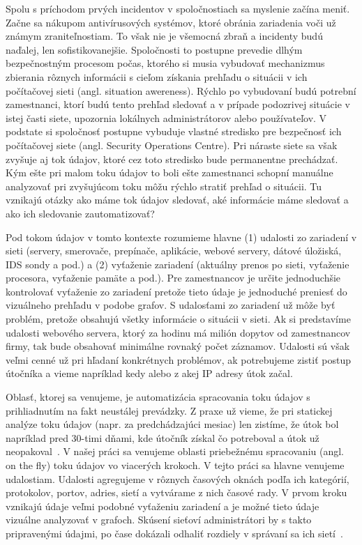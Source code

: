 \documentclass[thesismargins, thesislinespacing, openright, upjsfrontpage, combineabstracts]{rnthesis}
\begin{document}
Spolu s príchodom prvých incidentov v spoločnostiach sa myslenie začína meniť. Začne sa nákupom antivírusových systémov, ktoré obránia zariadenia voči už známym zraniteľnostiam. To však nie je všemocná zbraň a incidenty budú naďalej, len sofistikovanejšie. Spoločnosti to postupne prevedie dlhým bezpečnostným procesom počas, ktorého si musia vybudovať mechanizmus zbierania rôznych informácii s cieľom získania prehľadu o situácii v ich počítačovej sieti (angl. situation awereness). Rýchlo po vybudovaní budú potrební zamestnanci, ktorí budú tento prehľad sledovať a v prípade podozrivej situácie v istej časti siete, upozornia lokálnych administrátorov alebo používateľov. V podstate si spoločnosť postupne vybuduje vlastné stredisko pre bezpečnosť ich počítačovej siete (angl. Security Operations Centre). Pri náraste siete sa však zvyšuje aj tok údajov, ktoré cez toto stredisko bude permanentne prechádzať. Kým ešte pri malom toku údajov to boli ešte zamestnanci schopní manuálne analyzovať pri zvyšujúcom toku môžu rýchlo stratiť prehľad o situácii. Tu vznikajú otázky ako máme tok údajov sledovať, aké informácie máme sledovať a ako ich sledovanie zautomatizovať?

Pod tokom údajov v tomto kontexte rozumieme hlavne (1) udalosti zo zariadení v sieti (servery, smerovače, prepínače, aplikácie, webové servery, dátové úložiská, IDS sondy a pod.) a (2) vyťaženie zariadení (aktuálny prenos po sieti, vyťaženie procesora, vyťaženie pamäte a pod.). Pre zamestnancov je určite jednoduchšie kontrolovať vyťaženie zo zariadení pretože tieto údaje je jednoduché preniesť do vizuálneho prehľadu v podobe grafov. S udalosťami zo zariadení už môže byť problém, pretože obsahujú všetky informácie o situácii v sieti. Ak si predstavíme udalosti webového servera, ktorý za hodinu má milión dopytov od zamestnancov firmy, tak bude obsahovať minimálne rovnaký počet záznamov. Udalosti sú však veľmi cenné už pri hľadaní konkrétnych problémov, ak potrebujeme zistiť postup útočníka a vieme napríklad kedy alebo z akej IP adresy útok začal. 

Oblasť, ktorej sa venujeme, je automatizácia spracovania toku údajov s prihliadnutím na fakt neustálej prevádzky. Z praxe už vieme, že pri statickej analýze toku údajov (napr. za predchádzajúci mesiac) len zistíme, že útok bol napríklad pred 30-timi dňami, kde útočník získal čo potreboval a útok už neopakoval~\cite{park2010study}. V našej práci sa venujeme oblasti priebežnému spracovaniu (angl. on the fly) toku údajov vo viacerých krokoch. V tejto práci sa hlavne venujeme udalostiam. Udalosti agregujeme v rôznych časových oknách podľa ich kategórií, protokolov, portov, adries, sietí a vytvárame z nich časové rady. V prvom kroku vznikajú údaje veľmi podobné vyťaženiu zariadení a je možné tieto údaje vizuálne analyzovať v grafoch. Skúsení sieťoví administrátori by s takto pripravenými údajmi, po čase dokázali odhaliť rozdiely v správaní sa ich sietí~\cite{papagiannaki2005long}.
\end{document}

